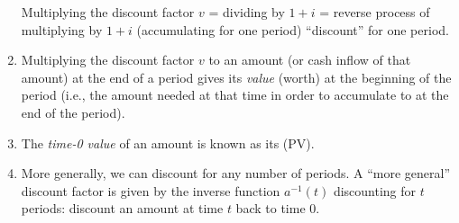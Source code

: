 \begin{enumerate}
\begin{note}
Multiplying the discount factor \(v\) = dividing by \(1+i\) = reverse process
of multiplying by \(1+i\) (accumulating for one period)
 ``discount'' for one period.
\end{note}
\item Multiplying the discount factor \(v\) to an amount 
(or cash inflow of that amount) at the end of a period gives its \emph{value}
(worth) at the beginning of the period (i.e., the amount needed at that time in
order to accumulate to  at the end of the period).
\begin{center}
\end{center}
\item The \emph{time-0 value} of an amount  is known as its
 (PV).
\item More generally, we can discount for any number of periods. A ``more
general'' discount factor is given by the inverse function \(a^{-1}(t)\)
 discounting for \(t\) periods: discount an amount
 at time \(t\) back to time 0.


\end{enumerate}
